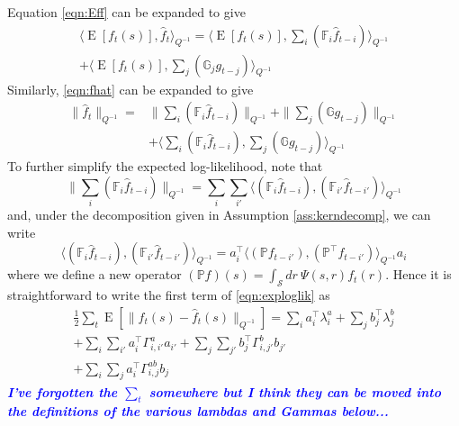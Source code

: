 \documentclass{IEEEtran}
\newcommand{\todo}[1]{\textsf{\emph{\textbf{\textcolor{blue}{#1}}}}}
\newcommand{\inner}[3]{\langle#1,#2\rangle_{#3}}
\newcommand{\dist}[2]{\|#1\|_{#2}}
\DeclareMathOperator{\E}{E}
\begin{document}
Equation \ref{eqn:Eff} can be expanded to give
\begin{equation}
	\begin{split}
	\inner{\E[f_t(s)]}{\hat{f}_t}{Q^{-1}} 
	 = \inner
		{\E[f_t(s)]}
		{\sum_i(\mathbb{F}_i\hat{f}_{t-i})}
		{Q^{-1}} \\
	+ \inner
		{\E[f_t(s)]}
		{\sum_j(\mathbb{G}_jg_{t-j})}
		{Q^{-1}}
	\end{split}
\end{equation}
Similarly, \ref{eqn:fhat} can be expanded to give
\begin{equation}
	\begin{split}
	\dist
		{\hat{f}_t}
		{Q^{-1}} 
	= & \dist
		{\sum_i(\mathbb{F}_i\hat{f}_{t-i})}
		{Q^{-1}} 
	+ \dist
		{\sum_j(\mathbb{G}g_{t-j})}
		{Q^{-1}}\\
	& + \inner
		{\sum_i(\mathbb{F}_i\hat{f}_{t-i})}
		{\sum_j(\mathbb{G}g_{t-j})}
		{Q^{-1}}
	\end{split}
\end{equation}
To further simplify the expected log-likelihood, note that
\begin{equation}
	\dist{\sum_i(\mathbb{F}_i\hat{f}_{t-i})}
	{Q^{-1}} = 
	\sum_i \sum_{i'} \inner
		{(\mathbb{F}_i\hat{f}_{t-i})}
		{(\mathbb{F}_{i'}\hat{f}_{t-i'})}
		{Q^{-1}}
\end{equation}
and, under the decomposition given in Assumption \ref{ass:kerndecomp}, we can write
\begin{equation}
	\inner
		{(\mathbb{F}_i\hat{f}_{t-i})}
		{(\mathbb{F}_{i'}\hat{f}_{t-i'})}
		{Q^{-1}} =  
	 a_i^\top \inner 
		{(\mathbb{P} f_{t-i'})}
		{(\mathbb{P}^\top f_{t-i'}) }
		{Q^{-1}} a_i
\end{equation}
where we define a new operator $(\mathbb{P} f)(s) = \int_\mathcal{S}dr~\Psi(s,r)f_t(r)$. Hence it is straightforward to write the first term of \ref{eqn:exploglik} as
\begin{equation}
	\label{eqn:norm_x_error}
	\begin{split}
	\frac{1}{2}\sum_t\E[\dist{f_t(s) - \hat{f}_t(s)}{Q^{-1}}] = 
		\sum_i a_i^\top \lambda^a_i + \sum_j b_j^\top \lambda^b_j \\
		+ \sum_i\sum_{i'}a_i^\top \Gamma_{i,i'}^a
		a_{i'} 
		+ \sum_j\sum_{j'}b_j^\top \Gamma_{i,j'}^b
		b_{j'} \\
		+ \sum_i\sum_{j}a_i^\top \Gamma_{i,j}^{ab}
		b_j
		\end{split}
\end{equation}
\todo{I've forgotten the $\sum_t$ somewhere but I think they can be moved into the definitions of the various lambdas and Gammas below...}
\end{document}

